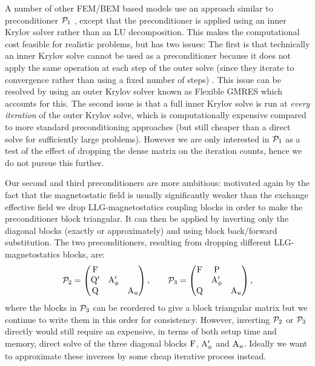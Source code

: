 A number of other FEM/BEM based models use an approach similar to preconditioner $\mathcal{P}_1$ \cite{Suess2002}, except that the preconditioner is applied using an inner Krylov solver rather than an LU decomposition.
This makes the computational cost feasible for realistic problems, but has two issues:
The first is that technically an inner Krylov solve cannot be used as a preconditioner because it does not apply the same operation at each step of the outer solve (since they iterate to convergence rather than using a fixed number of steps) \cite{Saad1993}.
This issue can be resolved by using an outer Krylov solver known as Flexible GMRES which accounts for this.
The second issue is that a full inner Krylov solve is run at \emph{every iteration} of the outer Krylov solve, which is computationally expensive compared to more standard preconditioning approaches (but still cheaper than a direct solve for sufficiently large problems).
However we are only interested in $\mathcal{P}_1$ as a test of the effect of dropping the dense matrix on the iteration counts, hence we do not pursue this further.

Our second and third preconditioners are more ambitious: motivated again by the fact that the magnetostatic field is usually significantly weaker than the exchange effective field we drop LLG-magnetostatics coupling blocks in order to make the preconditioner block triangular.
It can then be applied by inverting only the diagonal blocks (exactly or approximately) and using block back/forward substitution.
The two preconditioners, resulting from dropping different LLG-magnetostatics blocks, are:
\begin{equation}
  \mathcal{P}_2 =
  \begin{pmatrix}
    \mathrm{F}       &           &  \\
    \mathrm{Q}'       & \mathrm{A}_\phi'&   \\
    \mathrm{Q}       &           &   \mathrm{A}_u
  \end{pmatrix},
  \qquad
  \mathcal{P}_3 =
  \begin{pmatrix}
    \mathrm{F}       & \mathrm{P}       &  \\
    & \mathrm{A}_\phi' &   \\
    \mathrm{Q}       &           &   \mathrm{A}_u
  \end{pmatrix},
  \label{eq:ms-block-prec-drop-p}
\end{equation}
where the blocks in $\mathcal{P}_3$ can be reordered to give a block triangular matrix but we continue to write them in this order for consistency.
However, inverting $\mathcal{P}_2$ or $\mathcal{P}_3$ directly would still require an expensive, in terms of both setup time and memory, direct solve of the three diagonal blocks $\mathrm{F}$, $\mathrm{A}_\phi'$ and $\mathrm{A}_u$.
Ideally we want to approximate these inverses by some cheap iterative process instead.

